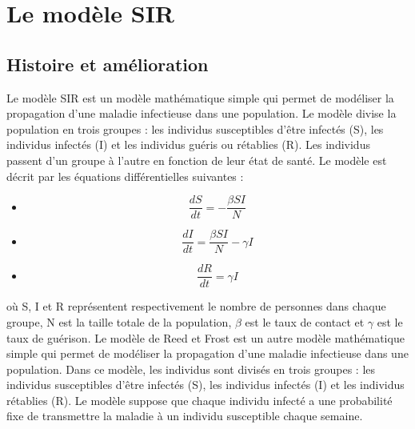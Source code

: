 \section{Le modèle SIR}
        \subsection{Histoire et amélioration}

Le modèle SIR est un modèle mathématique simple qui permet de modéliser la propagation d'une maladie infectieuse dans une population. Le modèle divise la population en trois groupes : les individus susceptibles d'être infectés (S), les individus infectés (I) et les individus guéris ou rétablies (R). Les individus passent d'un groupe à l'autre en fonction de leur état de santé. Le modèle est décrit par les équations différentielles suivantes :
	\begin{itemize}[label=$\bullet$]
	\item $$\displaystyle \frac{dS}{dt} = -\frac{\beta SI}{N}$$
	\end{itemize}
	
	\begin{itemize}[label=$\bullet$]
	\item $$\displaystyle \frac{dI}{dt} = \frac{\beta SI}{N} - \gamma I$$
	\end{itemize}
	
	\begin{itemize}[label=$\bullet$]
	\item $$\displaystyle \frac{dR}{dt} = \gamma I$$
	\end{itemize}
où S, I et R représentent respectivement le nombre de personnes dans chaque groupe, N est la taille totale de la population, $\beta$ est le taux de contact et $\gamma$ est le taux de guérison. Le modèle de Reed et Frost est un autre modèle mathématique simple qui permet de modéliser la propagation d'une maladie infectieuse dans une population. Dans ce modèle, les individus sont divisés en trois groupes : les individus susceptibles d'être infectés (S), les individus infectés (I) et les individus rétablies (R). Le modèle suppose que chaque individu infecté a une probabilité fixe de transmettre la maladie à un individu susceptible chaque semaine.


